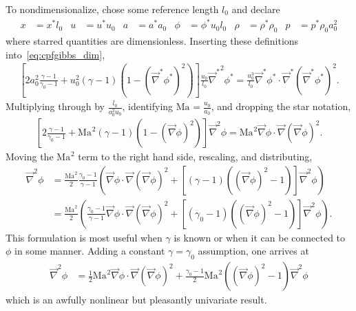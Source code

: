 \documentclass[letterpaper,11pt,nointlimits,reqno]{amsart}
\newcommand{\Mach}[1][]{\ensuremath{\mbox{Ma}_{#1}}}
\begin{document}
To nondimensionalize, chose some reference length $l_0$ and declare
\begin{align}
    x     &= x^\ast l_0
&   u     &= u^\ast u_0
&   a     &= a^\ast a_0
&   \phi  &= \phi^\ast u_0 l_0
&   \rho  &= \rho^\ast \rho_0
&   p     &= p^\ast \rho_0 a_0^2
\label{eq:nondimensionalization}
\end{align}
where starred quantities are dimensionless.
Inserting these definitions into~\eqref{eq:cpfgibbs_dim},
\begin{align}
    \left[
          2a_0^2 \frac{\gamma-1}{\gamma_0-1}
        + u_0^2 \left(\gamma-1\right)
          \left(1 - \left(\vec{\nabla}^\ast\phi^\ast\right)^2\right)
    \right] \frac{u_0}{l_0} {\vec{\nabla}^\ast}^2\phi^\ast
     =       \frac{u_0^3}{l_0} \vec{\nabla}^\ast\phi^\ast
       \cdot \vec{\nabla}^\ast\left(\vec{\nabla}^\ast\phi^\ast\right)^2
.
\end{align}
Multiplying through by $\frac{l_0}{a_0^2 u_0}$, identifying $\Mach =
\frac{u_0}{a_0}$, and dropping the star notation,
\begin{align}
    \left[
          2 \frac{\gamma-1}{\gamma_0-1}
        + \Mach^2 \left(\gamma-1\right)
          \left(1 - \left(\vec{\nabla}\phi\right)^2\right)
    \right] {\vec{\nabla}}^2\phi
     =       \Mach^2 \vec{\nabla}\phi
       \cdot \vec{\nabla}\left(\vec{\nabla}\phi\right)^2
.
\end{align}
Moving the $\Mach^2$ term to the right hand side, rescaling, and distributing,
\begin{align}
       {\vec{\nabla}}^2\phi
    &= \frac{\Mach^2}{2}\frac{\gamma_0-1}{\gamma-1} \left(
         \vec{\nabla}\phi \cdot \vec{\nabla}\left(\vec{\nabla}\phi\right)^2
       +
       \left[
             \left(\gamma-1\right)
             \left(\left(\vec{\nabla}\phi\right)^2 - 1\right)
       \right] {\vec{\nabla}}^2\phi
       \right)
\\  &= \frac{\Mach^2}{2} \left(
         \frac{\gamma_0-1}{\gamma-1}
         \vec{\nabla}\phi \cdot \vec{\nabla}\left(\vec{\nabla}\phi\right)^2
       +
       \left[
             \left(\gamma_0-1\right)
             \left(\left(\vec{\nabla}\phi\right)^2 - 1\right)
       \right] {\vec{\nabla}}^2\phi
       \right)
.
\end{align}
This formulation is most useful when $\gamma$ is known or when it can be
connected to $\phi$ in some manner.  Adding a constant $\gamma=\gamma_0$
assumption, one arrives at
\begin{align}
       {\vec{\nabla}}^2\phi
    &=   \frac{1}{2}\Mach^2
         \vec{\nabla}\phi \cdot \vec{\nabla}\left(\vec{\nabla}\phi\right)^2
       +
         \frac{\gamma_0-1}{2}\Mach^2
         \left(\left(\vec{\nabla}\phi\right)^2 - 1\right)
         {\vec{\nabla}}^2\phi
\label{eq:cpfgibbs_nondim}
\end{align}
which is an awfully nonlinear but pleasantly univariate result.
\end{document}
